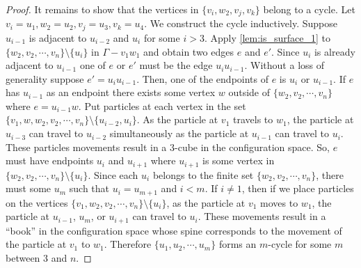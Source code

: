 \begin{proof}
    It remains to show that the vertices in \(\{v_i, w_2, v_j, v_k\}\) belong to a cycle.
    Let \(v_i = u_1, w_2 = u_2, v_j = u_3, v_k = u_4\).
    We construct the cycle inductively.
    Suppose \(u_{i - 1}\) is adjacent to \(u_{i - 2}\) and \(u_i\) for some \(i > 3\).
    Apply \ref{lem:is_surface_1} to \(\{w_2, v_2, \cdots, v_n\}\setminus\{u_i\}\) in \(\Gamma - v_1 w_1\) and obtain
    two edges \(e\) and \(e'\).
    Since \(u_i\) is already adjacent to \(u_{i-1}\) one of \(e\) or \(e'\) must
    be the edge \(u_i u_{i -1}\).
    Without a loss of generality suppose \(e' = u_i u_{i-1}\).
    Then, one of the endpoints of \(e\) is \(u_i\) or \(u_{i-1}\).
    If \(e\) has \(u_{i-1}\) as an endpoint there exists
    some vertex \(w\) outside of \(\{w_2, v_2, \cdots, v_n\}\) where \(e = u_{i-1} w\).
    Put particles at each vertex in the set \(\{v_1, w, w_2, v_2, \cdots, v_n\}\setminus\{u_{i-2}, u_i\}\).
    As the particle at \(v_1\) travels to \(w_1\),
    the particle at \(u_{i-3}\) can travel to \(u_{i-2}\) simultaneously as the particle
    at \(u_{i-1}\) can travel to \(u_i\).
    These particles movements result in a \(3\)-cube in the configuration space.
    So, \(e\) must have endpoints \(u_i\) and \(u_{i+1}\) where \(u_{i+1}\) is some vertex in \(\{w_2, v_2, \cdots, v_n\}\setminus\{u_i\}\).
    Since each \(u_i\) belongs to the finite set \(\{w_2, v_2, \cdots, v_n\}\),
    there must some \(u_m\) such that \(u_i = u_{m+1}\) and \(i < m\).
    If \(i \neq 1\), then if we place particles on the vertices
    \(\{v_1, w_2, v_2, \cdots, v_n\}\setminus \{u_i\}\), as the particle at \(v_1\) moves to \(w_1\),
    the particle at \(u_{i - 1}\), \(u_m\), or \(u_{i + 1}\) can travel to \(u_i\).
    These movements result in a ``book'' in the configuration space whose spine corresponds to the movement of the particle at \(v_1\) to \(w_1\).
    Therefore \(\{u_1, u_2, \cdots, u_m\}\) forms an \(m\)-cycle for some \(m\) between \(3\) and \(n\).
\end{proof}


